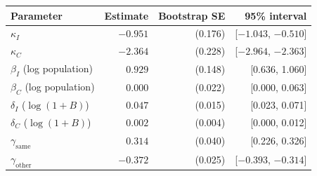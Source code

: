 \begin{tabular}{@{}lrrr@{}}
\toprule
Parameter & Estimate & Bootstrap SE & 95\% interval \\
\midrule
$\kappa_I$ & $-0.951$ & (0.176) & [$-1.043$, $-0.510$] \\
$\kappa_C$ & $-2.364$ & (0.228) & [$-2.964$, $-2.363$] \\
$\beta_I$ (log population) & $0.929$ & (0.148) & [0.636, 1.060] \\
$\beta_C$ (log population) & $0.000$ & (0.022) & [0.000, 0.063] \\
$\delta_I$ ($\log(1+B)$) & $0.047$ & (0.015) & [0.023, 0.071] \\
$\delta_C$ ($\log(1+B)$) & $0.002$ & (0.004) & [0.000, 0.012] \\
$\gamma_{\text{same}}$ & $0.314$ & (0.040) & [0.226, 0.326] \\
$\gamma_{\text{other}}$ & $-0.372$ & (0.025) & [$-0.393$, $-0.314$] \\
\bottomrule
\end{tabular}
